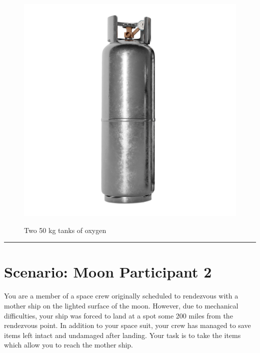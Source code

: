 \documentclass{article}
\begin{document}
    \begin{figure}[H]
        \centering
        \begin{minipage}{0.25\textwidth}
            \centering
            \includegraphics[width=\textwidth]{../SurvivalItemImages/oxygen}
        \end{minipage}\hfill
        \begin{minipage}{0.7\textwidth}
            \centering
            \Large Two 50 kg tanks of oxygen
        \end{minipage}
    \end{figure}
    \vspace{-0.8em}
    \noindent\rule{\textwidth}{0.4pt}
            
    \clearpage
    \section*{Scenario: \textmd{Moon} \hfill Participant \textmd{2}}
    \Large You are a member of a space crew originally scheduled to rendezvous with a mother ship on the lighted surface of the moon. However, due to mechanical difficulties, your ship was forced to land at a spot some 200 miles from the rendezvous point. In addition to your space suit, your crew has managed to save items left intact and undamaged after landing. Your task is to take the items which allow you to reach the mother ship.
\clearpage
        
\end{document}
